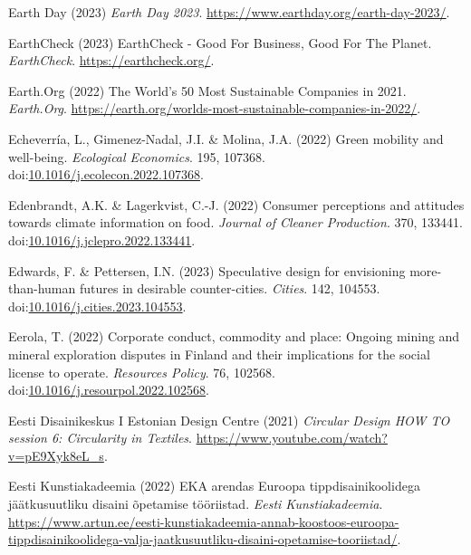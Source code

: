 \documentclass[
  letterpaper,
  DIV=11,
  numbers=noendperiod]{scrartcl}
\newlength{\cslhangindent}
\newenvironment{CSLReferences}[2] %
 {\begin{list}{}{%
  \setlength{\itemindent}{0pt}
  \setlength{\leftmargin}{0pt}
  \setlength{\parsep}{0pt}
  \ifodd #1
   \setlength{\leftmargin}{\cslhangindent}
   \setlength{\itemindent}{-1\cslhangindent}
  \fi
  \setlength{\itemsep}{#2\baselineskip}}}
 {\end{list}}
\begin{document}
\begin{CSLReferences}{0}{1}
Earth Day (2023) \emph{Earth {Day} 2023}.
\url{https://www.earthday.org/earth-day-2023/}.

EarthCheck (2023) {EarthCheck} - {Good For Business}, {Good For The
Planet}. \emph{EarthCheck}. \url{https://earthcheck.org/}.

Earth.Org (2022) The {World}'s 50 {Most Sustainable Companies} in 2021.
\emph{Earth.Org}.
\url{https://earth.org/worlds-most-sustainable-companies-in-2022/}.

Echeverría, L., Gimenez-Nadal, J.I. \& Molina, J.A. (2022) Green
mobility and well-being. \emph{Ecological Economics}. 195, 107368.
doi:\href{https://doi.org/10.1016/j.ecolecon.2022.107368}{10.1016/j.ecolecon.2022.107368}.

Edenbrandt, A.K. \& Lagerkvist, C.-J. (2022) Consumer perceptions and
attitudes towards climate information on food. \emph{Journal of Cleaner
Production}. 370, 133441.
doi:\href{https://doi.org/10.1016/j.jclepro.2022.133441}{10.1016/j.jclepro.2022.133441}.

Edwards, F. \& Pettersen, I.N. (2023) Speculative design for envisioning
more-than-human futures in desirable counter-cities. \emph{Cities}. 142,
104553.
doi:\href{https://doi.org/10.1016/j.cities.2023.104553}{10.1016/j.cities.2023.104553}.

Eerola, T. (2022) Corporate conduct, commodity and place: {Ongoing}
mining and mineral exploration disputes in {Finland} and their
implications for the social license to operate. \emph{Resources Policy}.
76, 102568.
doi:\href{https://doi.org/10.1016/j.resourpol.2022.102568}{10.1016/j.resourpol.2022.102568}.

Eesti Disainikeskus I Estonian Design Centre (2021) \emph{Circular
{Design HOW TO} session 6: {Circularity} in {Textiles}}.
\url{https://www.youtube.com/watch?v=pE9Xyk8eL_s}.

Eesti Kunstiakadeemia (2022) {EKA arendas Euroopa tippdisainikoolidega
j{ä}{ä}tkusuutliku disaini {õ}petamise t{ö}{ö}riistad}. \emph{Eesti
Kunstiakadeemia}.
\url{https://www.artun.ee/eesti-kunstiakadeemia-annab-koostoos-euroopa-tippdisainikoolidega-valja-jaatkusuutliku-disaini-opetamise-tooriistad/}.


\end{CSLReferences}
\end{document}

